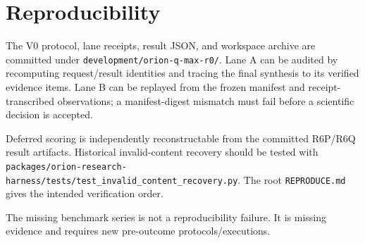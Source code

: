 \section{Reproducibility}

The V0 protocol, lane receipts, result JSON, and workspace archive are committed under \texttt{development/orion-q-max-r0/}. Lane A can be audited by recomputing request/result identities and tracing the final synthesis to its verified evidence items. Lane B can be replayed from the frozen manifest and receipt-transcribed observations; a manifest-digest mismatch must fail before a scientific decision is accepted.

Deferred scoring is independently reconstructable from the committed R6P/R6Q result artifacts. Historical invalid-content recovery should be tested with \texttt{packages/orion-research-harness/tests/test_invalid_content_recovery.py}. The root \texttt{REPRODUCE.md} gives the intended verification order.

The missing benchmark series is not a reproducibility failure. It is missing evidence and requires new pre-outcome protocols/executions.